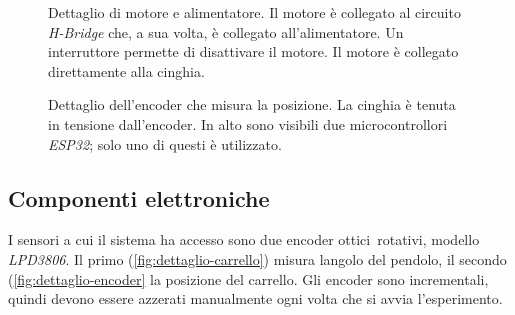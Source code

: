 \begin{figure}[h]
    \centering
    \caption[Dettaglio del motore]{Dettaglio di motore e alimentatore.
    Il motore è collegato al circuito \emph{H-Bridge} che, a sua volta, è collegato
    all'alimentatore. Un interruttore permette di disattivare il motore.
    Il motore è collegato direttamente alla cinghia.}
    \label{fig:dettaglio-motore}
\end{figure}
\begin{figure}[h]
    \centering
    \caption[Dettaglio encoder]{Dettaglio dell'encoder che misura la posizione.
    La cinghia è tenuta in tensione dall'encoder.
    In alto sono visibili due microcontrollori
    \emph{ESP32}; solo uno di questi è utilizzato.
    }
    \label{fig:dettaglio-encoder}
\end{figure}

\subsection{Componenti elettroniche}
\label{subsec:componenti-elettroniche}

I sensori a cui il sistema ha accesso sono due encoder ottici\footnotemark\ rotativi,
modello \emph{LPD3806}.
Il primo (\autoref{fig:dettaglio-carrello}) misura langolo del pendolo,
il secondo (\autoref{fig:dettaglio-encoder} la posizione del carrello.
Gli encoder sono incrementali, quindi devono essere azzerati manualmente
ogni volta che si avvia l'esperimento.


